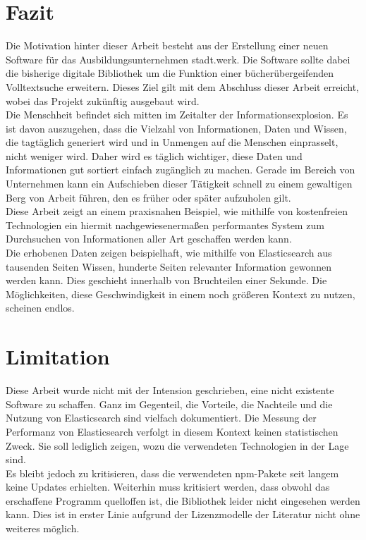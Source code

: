 \documentclass[a4paper]{scrartcl}
\begin{document}
\section{Fazit}
Die Motivation hinter dieser Arbeit besteht aus der Erstellung einer neuen Software für das Ausbildungsunternehmen stadt.werk. Die Software sollte dabei die bisherige digitale Bibliothek um die Funktion einer bücherübergeifenden Volltextsuche erweitern. Dieses Ziel gilt mit dem Abschluss dieser Arbeit erreicht, wobei das Projekt zukünftig ausgebaut wird. \\
Die Menschheit befindet sich mitten im Zeitalter der Informationsexplosion. Es ist davon auszugehen, dass die Vielzahl von Informationen, Daten und Wissen, die tagtäglich generiert wird und in Unmengen auf die Menschen einprasselt, nicht weniger wird. Daher wird es täglich wichtiger, diese Daten und Informationen gut sortiert einfach zugänglich zu machen. Gerade im Bereich von Unternehmen kann ein Aufschieben dieser Tätigkeit schnell zu einem gewaltigen Berg von Arbeit führen, den es früher oder später aufzuholen gilt. \\
Diese Arbeit zeigt an einem praxisnahen Beispiel, wie mithilfe von kostenfreien Technologien ein hiermit nachgewiesenermaßen performantes System zum Durchsuchen von Informationen aller Art geschaffen werden kann. \\

Die erhobenen Daten zeigen beispielhaft, wie mithilfe von Elasticsearch aus tausenden Seiten Wissen, hunderte Seiten relevanter Information gewonnen werden kann. Dies geschieht innerhalb von Bruchteilen einer Sekunde. Die Möglichkeiten, diese Geschwindigkeit in einem noch größeren Kontext zu nutzen, scheinen endlos. 

\newpage

\section{Limitation}
Diese Arbeit wurde nicht mit der Intension geschrieben, eine nicht existente Software zu schaffen. Ganz im Gegenteil, die Vorteile, die Nachteile und die Nutzung von Elasticsearch sind vielfach dokumentiert. Die Messung der Performanz von Elasticsearch verfolgt in diesem Kontext keinen statistischen Zweck. Sie soll lediglich zeigen, wozu die verwendeten Technologien in der Lage sind. \\

Es bleibt jedoch zu kritisieren, dass die verwendeten npm-Pakete seit langem keine Updates erhielten. Weiterhin muss kritisiert werden, dass obwohl das erschaffene Programm quelloffen ist, die Bibliothek leider nicht eingesehen werden kann. Dies ist in erster Linie aufgrund der Lizenzmodelle der Literatur nicht ohne weiteres möglich.
\end{document}
